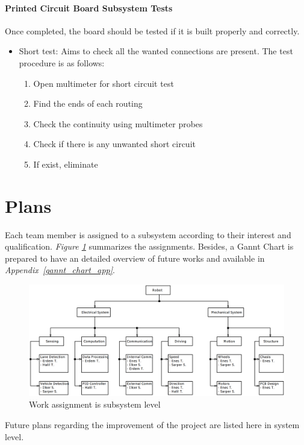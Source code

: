 \documentclass[a4paper,12pt]{article}
\begin{document}
	
	\paragraph{Printed Circuit Board Subsystem Tests}
	Once completed, the board should be tested if it is built properly and correctly.
	\begin{itemize}
		\item Short test: Aims to check all the wanted connections are present. The test procedure is as follows:
		\begin{enumerate} 
			\item Open multimeter for short circuit test \vspace{-0.2cm}
			\item Find the ends of each routing 
			\item Check the continuity using multimeter probes
			\item Check if there is any unwanted short circuit
			\item If exist, eliminate
		\end{enumerate}
	\end{itemize}
	
	
	
	\section{Plans}
	Each team member is assigned to a subsystem according to their interest and qualification. \textit{Figure \ref{fig:plan-org}} summarizes the assignments. Besides, a Gannt Chart is prepared to have an detailed overview of future works and available in \textit{Appendix~\ref{gannt_chart_app}}.
	\begin{figure}[h]
		\includegraphics[width=\textwidth,center]{images/plan-organization}
		\caption{Work assignment is subsystem level}\label{fig:plan-org}
	\end{figure}
	Future plans regarding the improvement of the project are listed here in system level.
\end{document}
